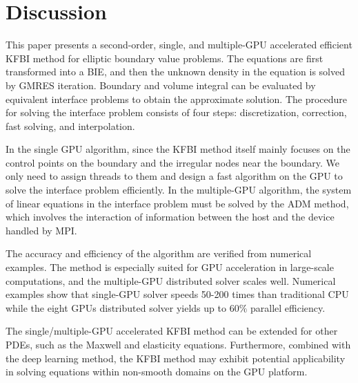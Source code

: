 \section{Discussion}

This paper presents a second-order, single, and multiple-GPU accelerated efficient KFBI method for  elliptic boundary value problems. The equations are first transformed into a BIE, and then the unknown density in the equation is solved by GMRES iteration. Boundary and volume integral can be evaluated by equivalent interface problems to obtain the approximate solution. The procedure for solving the interface problem consists of four steps: discretization, correction, fast solving, and interpolation.
 
In the single GPU algorithm, since the KFBI method itself mainly 
focuses on the control points on the boundary and the irregular nodes near the boundary. We only need to assign  threads to them and design a fast algorithm on the GPU to solve the interface problem efficiently. In the multiple-GPU algorithm, the system of linear equations in the interface problem must be solved by the ADM method, which involves the interaction of information between the host and the device handled by MPI. 

The accuracy and efficiency of the algorithm are verified from numerical examples. The method is especially suited for GPU acceleration in large-scale computations, and the multiple-GPU distributed solver scales well. Numerical examples show that single-GPU solver speeds 50-200 times than traditional CPU while the eight GPUs distributed solver yields up to $60\%$ parallel efficiency.

The single/multiple-GPU accelerated KFBI method can be extended for other PDEs, such as the Maxwell and elasticity equations. Furthermore, combined with the deep learning method, the KFBI method may exhibit potential applicability in solving equations within non-smooth domains on the GPU platform.